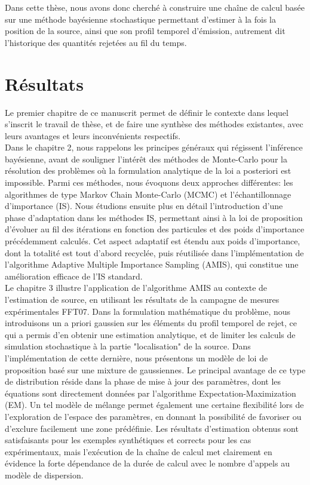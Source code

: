 Dans cette thèse, nous avons donc cherché à construire une chaîne de calcul  basée sur une méthode bayésienne stochastique permettant d'estimer à la fois la position de la source, ainsi que son profil temporel d'émission, autrement dit l'historique des quantités rejetées au fil du temps.

\section{Résultats}

Le premier chapitre de ce manuscrit permet de définir le contexte dans lequel s'inscrit le travail de thèse, et de faire une synthèse des méthodes existantes, avec leurs avantages et leurs inconvénients respectifs.\\


Dans le chapitre 2, nous rappelons les principes généraux qui régissent l'inférence bayésienne, avant de souligner l'intérêt des méthodes de Monte-Carlo pour la résolution des problèmes où la formulation analytique de la loi a posteriori est impossible. Parmi ces méthodes, nous évoquons deux approches différentes: les algorithmes de type Markov Chain Monte-Carlo (MCMC) et l'échantillonnage d'importance (IS). Nous étudions ensuite plus en détail l'introduction d'une phase d'adaptation dans les méthodes IS, permettant ainsi à la loi de proposition d'évoluer au fil des itérations en fonction des particules et des poids d'importance précédemment calculés. Cet aspect adaptatif est étendu aux poids d'importance, dont la totalité est tout d'abord recyclée, puis réutilisée dans l'implémentation de l'algorithme Adaptive Multiple Importance Sampling (AMIS), qui constitue une amélioration efficace de l'IS standard. \\

Le chapitre 3 illustre l'application de l'algorithme AMIS au contexte de l'estimation de source, en utilisant les résultats de la campagne de mesures expérimentales FFT07. Dans la formulation mathématique du problème, nous introduisons un a priori gaussien sur les éléments du profil temporel de rejet, ce qui a permis d'en obtenir une estimation analytique, et de limiter les calculs de simulation stochastique à la partie "localisation" de la source. Dans l'implémentation de cette dernière, nous présentons un modèle de loi de proposition basé sur une mixture de gaussiennes. Le principal avantage de ce type de distribution réside dans la phase de mise à jour des paramètres, dont les équations sont directement données par l'algorithme Expectation-Maximization (EM). Un tel modèle de mélange permet également une certaine flexibilité lors de l'exploration de l'espace des paramètres, en donnant la possibilité de favoriser ou d'exclure facilement une zone prédéfinie. Les résultats d'estimation obtenus sont satisfaisants pour les exemples synthétiques et corrects pour les cas expérimentaux, mais l'exécution de la chaîne de calcul met clairement  en évidence la forte dépendance de la durée de calcul avec le nombre d'appels au modèle de dispersion. \\

